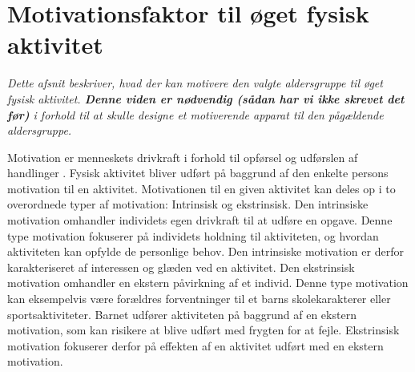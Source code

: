 \section{Motivationsfaktor til øget fysisk aktivitet}\label{motivation_boern}
\textit{Dette afsnit beskriver, hvad der kan motivere den valgte aldersgruppe til øget fysisk aktivitet. \textbf{Denne viden er nødvendig (sådan har vi ikke skrevet det før)} i forhold til at skulle designe et motiverende apparat til den pågældende aldersgruppe.}

Motivation er menneskets drivkraft i forhold til opførsel og udførslen af handlinger \citep{V.Brown2007}. Fysisk aktivitet bliver udført på baggrund af den enkelte persons motivation til en aktivitet. Motivationen til en given aktivitet kan deles op i to overordnede typer af motivation: Intrinsisk og ekstrinsisk. Den intrinsiske motivation omhandler individets egen drivkraft til at udføre en opgave. Denne type motivation fokuserer på individets holdning til aktiviteten, og hvordan aktiviteten kan opfylde de personlige behov. Den intrinsiske motivation er derfor karakteriseret af interessen og glæden ved en aktivitet. Den ekstrinsisk motivation omhandler en ekstern påvirkning af et individ. Denne type motivation kan eksempelvis være forældres forventninger til et barns skolekarakterer eller sportsaktiviteter. Barnet udfører aktiviteten på baggrund af en ekstern motivation, som kan risikere at blive udført med frygten for at fejle. Ekstrinsisk motivation fokuserer derfor på effekten af en aktivitet udført med en ekstern motivation. \citep{J.Sebire2013} 

